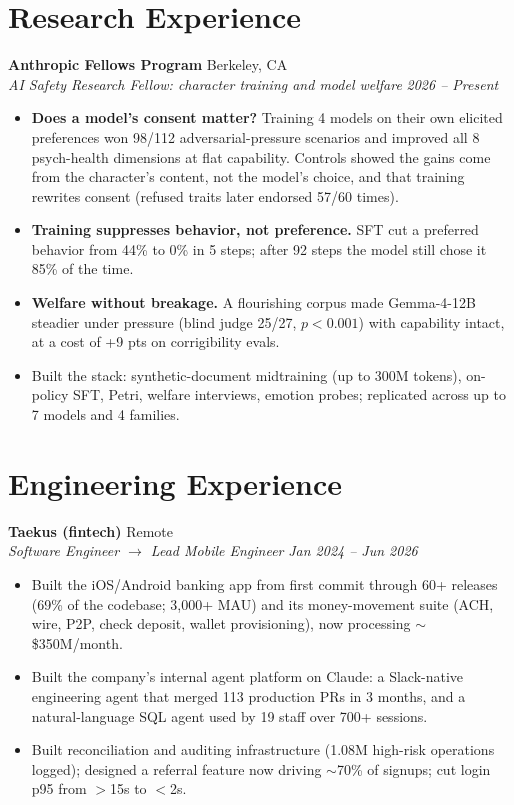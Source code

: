 \documentclass[10pt,letterpaper]{article}
\newcommand{\entryhead}[4]{
    \textbf{#1} \hfill #2 \\
    \textit{#3} \hfill \textit{#4}
}
\begin{document}
\section{Research Experience}

\entryhead{Anthropic Fellows Program}{Berkeley, CA}{AI Safety Research Fellow: character training and model welfare}{2026 -- Present}
\begin{itemize}
    \item \textbf{Does a model's consent matter?} Training 4 models on their own elicited preferences won 98/112 adversarial-pressure scenarios and improved all 8 psych-health dimensions at flat capability. Controls showed the gains come from the character's content, not the model's choice, and that training rewrites consent (refused traits later endorsed 57/60 times).
    \item \textbf{Training suppresses behavior, not preference.} SFT cut a preferred behavior from 44\% to 0\% in 5 steps; after 92 steps the model still chose it 85\% of the time.
    \item \textbf{Welfare without breakage.} A flourishing corpus made Gemma-4-12B steadier under pressure (blind judge 25/27, $p<0.001$) with capability intact, at a cost of +9 pts on corrigibility evals.
    \item Built the stack: synthetic-document midtraining (up to 300M tokens), on-policy SFT, Petri, welfare interviews, emotion probes; replicated across up to 7 models and 4 families.
\end{itemize}


\section{Engineering Experience}

\entryhead{Taekus (fintech)}{Remote}{Software Engineer $\to$ Lead Mobile Engineer}{Jan 2024 -- Jun 2026}
\begin{itemize}
    \item Built the iOS/Android banking app from first commit through 60+ releases (69\% of the codebase; 3,000+ MAU) and its money-movement suite (ACH, wire, P2P, check deposit, wallet provisioning), now processing $\sim$\$350M/month.
    \item Built the company's internal agent platform on Claude: a Slack-native engineering agent that merged 113 production PRs in 3 months, and a natural-language SQL agent used by 19 staff over 700+ sessions.
    \item Built reconciliation and auditing infrastructure (1.08M high-risk operations logged); designed a referral feature now driving $\sim$70\% of signups; cut login p95 from $>$15s to $<$2s.
\end{itemize}
\end{document}
